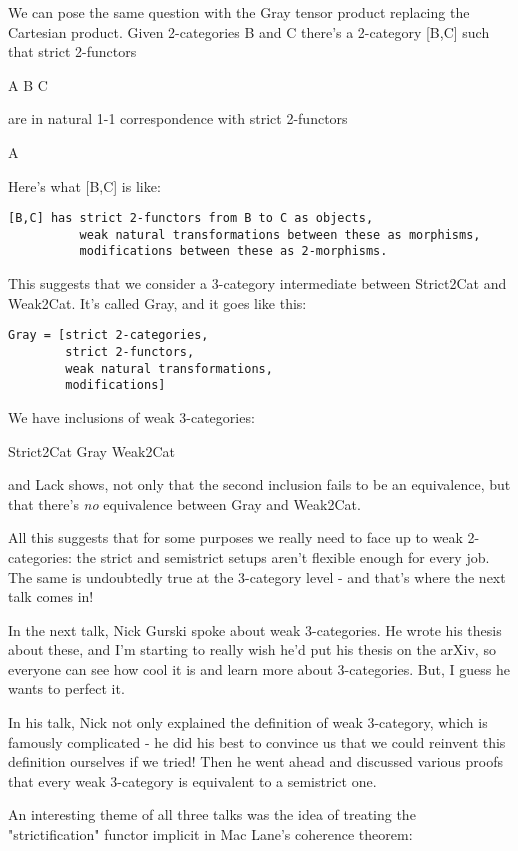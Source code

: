 We can pose the same question with the Gray tensor product replacing
the Cartesian product.  Given 2-categories B and C there's a 
2-category [B,C] such that strict 2-functors

A \otimes  B \to  C

are in natural 1-1 correspondence with strict 2-functors

A \to  [B,C]

Here's what [B,C] is like:

\begin{verbatim}
[B,C] has strict 2-functors from B to C as objects,
          weak natural transformations between these as morphisms, 
          modifications between these as 2-morphisms.
\end{verbatim}
    
This suggests that we consider a 3-category intermediate between
Strict2Cat and Weak2Cat.   It's called Gray, and it goes like this:

\begin{verbatim}
Gray = [strict 2-categories, 
        strict 2-functors, 
        weak natural transformations,
        modifications]
\end{verbatim}
    
We have inclusions of weak 3-categories:

Strict2Cat \to  Gray \to  Weak2Cat

and Lack shows, not only that the second inclusion fails to be an
equivalence, but that there's \emph{no} equivalence between Gray and
Weak2Cat.

All this suggests that for some purposes we really need to face up
to weak 2-categories: the strict and semistrict setups aren't flexible
enough for every job.  The same is undoubtedly true at the 3-category
level - and that's where the next talk comes in!

In the next talk, Nick Gurski spoke about weak 3-categories.  He wrote
his thesis about these, and I'm starting to really wish he'd put his
thesis on the arXiv, so everyone can see how cool it is and learn more
about 3-categories.  But, I guess he wants to perfect it.  

In his talk, Nick not only explained the definition of weak
3-category, which is famously complicated - he did his best to
convince us that we could reinvent this definition ourselves if we
tried!  Then he went ahead and discussed various proofs that every
weak 3-category is equivalent to a semistrict one.

An interesting theme of all three talks was the idea of treating 
the "strictification" functor implicit in Mac Lane's coherence 
theorem:

